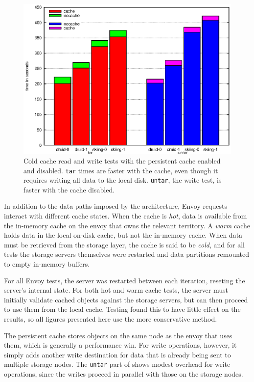 \begin{figure}[t]
\centering
\includegraphics[width=\figwidth]{figures/envoy-cold-vs-nocache}
\caption[Cold cache results with and without persistent cache]{Cold cache read and write tests with the persistent cache enabled and disabled. \texttt{tar} times are faster with the cache, even though it requires writing all data to the local disk. \texttt{untar}, the write test, is faster with the cache disabled.}
\label{fig:envoy-cold-vs-nocache}
\end{figure}

In addition to the data paths imposed by the architecture, Envoy requests interact with different cache states. When the cache is \emph{hot}, data is available from the in-memory cache on the envoy that owns the relevant territory. A \emph{warm} cache holds data in the local on-disk cache, but not the in-memory cache. When data must be retrieved from the storage layer, the cache is said to be \emph{cold}, and for all tests the storage servers themselves were restarted and data partitions remounted to empty in-memory buffers.

For all Envoy tests, the server was restarted between each iteration, reseting the server's internal state. For both hot and warm cache tests, the server must initially validate cached objects against the storage servers, but can then proceed to use them from the local cache. Testing found this to have little effect on the results, so all figures presented here use the more conservative method.

The persistent cache stores objects on the same node as the envoy that uses them, which is generally a performance win. For write operations, however, it simply adds another write destination for data that is already being sent to multiple storage nodes. The \texttt{untar} part of  shows modest overhead for write operations, since the writes proceed in parallel with those on the storage nodes.

